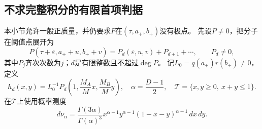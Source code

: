 \documentclass[11pt,a4paper]{ctexart}
\theoremstyle{cnplain}\newtheorem{theorem}{定理}[section]
\theoremstyle{definition}\newtheorem{definition}[theorem]{定义}
\theoremstyle{remark}\newtheorem{remark}[theorem]{注}
\begin{document}
\subsection{不求完整积分的有限首项判据}
本小节允许一般正质量，并仍要求$F$在$(\tau,a_+,b_+)$没有极点。
先设$P\ne0$，把分子在阈值点展开为
\begin{equation}\label{eq:weightedjet}
 P(\tau+\varepsilon,a_++u,b_++v)
       =P_d(\varepsilon,u,v)+P_{d+1}+\cdots,\qquad P_d\ne0,
\end{equation}
其中$P_j$齐次次数为$j$；$d$是有限整数且不超过$\deg P$。
记$L_0=q(a_+)r(b_+)\ne0$，定义
\[
 h_d(x,y)=L_0^{-1}P_d\left(1,\frac{M_A}{M}x,\frac{M_B}{M}y\right),
 \quad \alpha=\frac{D-1}{2},\quad
 \mathcal T=\{x,y\ge0,\ x+y\le1\}.
 \]
在$\mathcal T$上使用概率测度
\[
 d\nu_\alpha=
 \frac{\Gamma(3\alpha)}{\Gamma(\alpha)^3}
 x^{\alpha-1}y^{\alpha-1}(1-x-y)^{\alpha-1}\,dx\,dy.
\]
\end{document}
